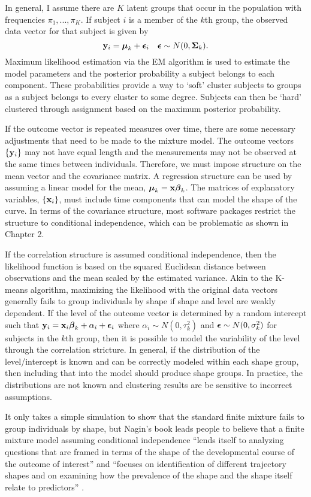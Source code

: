 In general, I assume there are $K$ latent groups that occur in the population with frequencies $\pi_{1},...,\pi_{K}$. If subject $i$ is a member of the $k$th group, the observed data vector for that subject is given by
$$\mathbf y_{i} = \boldsymbol\mu_{k}+\boldsymbol\epsilon_{i}\quad \boldsymbol\epsilon \sim N(0,\boldsymbol\Sigma_{k}).$$
Maximum likelihood estimation via the EM algorithm is used to estimate the model parameters and the posterior probability a subject belongs to each component. These probabilities provide a way to `soft' cluster subjects to groups as a subject belongs to every cluster to some degree. Subjects can then be `hard' clustered through assignment based on the maximum posterior probability. 

If the outcome vector is repeated measures over time, there are some necessary adjustments that need to be made to the mixture model. The outcome vectors $\{\mathbf y_{i}\}$ may not have equal length and the measurements may not be observed at the same times between individuals. Therefore, we must impose structure on the mean vector and the covariance matrix. A regression structure can be used by assuming a linear model for the mean, $\boldsymbol\mu_k=\mathbf x \boldsymbol\beta_k$. The matrices of explanatory variables, $\{\mathbf x_{i}\}$, must include time components that can model the shape of the curve.  In terms of the covariance structure, most software packages restrict the structure to conditional independence, which can be problematic as shown in Chapter 2.

If the correlation structure is assumed conditional independence, then the likelihood function is based on the squared Euclidean distance between observations and the mean scaled by the estimated variance. Akin to the K-means algorithm, maximizing the likelihood with the original data vectors generally fails to group individuals by shape if shape and level are weakly dependent. If the level of the outcome vector is determined by a random intercept such that $\mathbf y_{i} = \mathbf x_{i}\boldsymbol\beta_{k} + \alpha_{i}+\boldsymbol\epsilon_{i}$ where $\alpha_{i}\sim N(0,\tau_k^{2})$ and $\boldsymbol\epsilon\sim N(0,\sigma^{2}_{k})$ for subjects in the $k$th group, then it is possible to model the variability of the level through the correlation stricture. In general, if the distribution of the level/intercept is known and can be correctly modeled within each shape group, then including that into the model should produce shape groups. In practice, the distributions are not known and clustering results are be sensitive to incorrect assumptions.

It only takes a simple simulation to show that the standard finite mixture fails to group individuals by shape, but Nagin's book leads people to believe that a finite mixture model assuming conditional independence ``lends itself to analyzing questions that are framed in terms of the shape of the developmental course of the outcome of interest''  and  ``focuses on identification of different trajectory shapes and on examining how the prevalence of the shape and the shape itself relate to predictors'' \cite{nagin2005}. 



